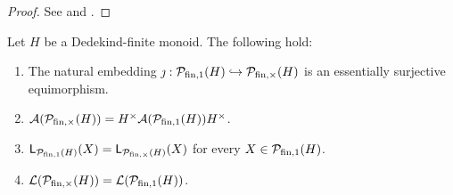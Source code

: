 %
\begin{proof}
	See \cite[Theorem 2.22(i)]{fan-tringali18} and \cite[Theorem 3.3(i)]{tringali18}.
\end{proof}
%
\begin{prop}\label{prop:funt&fun-have-the-same-system-of-lengths}
	Let $H$ be a Dedekind-finite monoid. The following hold:
	\begin{enumerate}[label={\rm (\roman{*})}]
	\item\label{it:prop:funt&fun-have-the-same-system-of-lengths(i)} The natural embedding $\jmath: \mathcal{P}_{\textrm{fin}, 1}(H)\hookrightarrow \mathcal{P}_{\textrm{fin}, \times}(H)$ is an essentially surjective equimorphism.
	\item\label{it:prop:funt&fun-have-the-same-system-of-lengths(ii)} $\mathcal{A}(\mathcal P_{{\textrm{fin}, \times}}(H)) = H^\times \mathcal{A}(\mathcal P_{{\textrm{fin}, 1}}(H)) H^\times$.
	\item\label{it:prop:funt&fun-have-the-same-system-of-lengths(iii)} $\mathsf{L}_{\mathcal P_{{\textrm{fin}, 1}}(H)}(X) = \mathsf{L}_{\mathcal P_{{\textrm{fin}, \times}}(H)}(X)$ for every $X \in \mathcal P_{{\textrm{fin}, 1}}(H)$.
	\item\label{it:prop:funt&fun-have-the-same-system-of-lengths(iv)} $\mathcal{L}(\mathcal P_{{\textrm{fin}, \times}}(H)) = \mathcal{L}(\mathcal P_{{\textrm{fin}, 1}}(H))$.
	\end{enumerate}
\end{prop}
%
